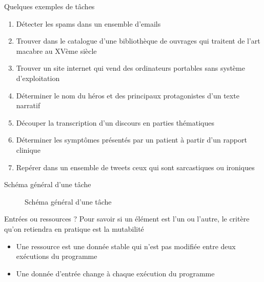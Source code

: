 \documentclass[xcolor={svgnames}, french]{beamer}
\begin{document}
\begin{frame}{Quelques exemples de tâches}
	\begin{enumerate}
		\item Détecter les spams dans un ensemble d'emails
		\item Trouver dans le catalogue d'une bibliothèque de ouvrages qui traitent de l'art macabre au XVème siècle
		\item Trouver un site internet qui vend des ordinateurs portables sans système d'exploitation
		\item Déterminer le nom du héros et des principaux protagonistes d'un texte narratif
		\item Découper la transcription d'un discours en parties thématiques
		\item Déterminer les symptômes présentés par un patient à partir d'un rapport clinique
		\item Repérer dans un ensemble de tweets ceux qui sont sarcastiques ou ironiques
	\end{enumerate}
\end{frame}

\begin{frame}[fragile]{Schéma général d'une tâche}
	\begin{figure}
		\tikzset{external/export=true}
		\caption{Schéma général d'une tâche}
	\end{figure}
\end{frame}

\begin{frame}{Entrées ou ressources ?}
	Pour savoir si un élément est l'un ou l'autre, le critère qu'on retiendra en pratique est la \alert{mutabilité}
	\begin{itemize}
		\item Une ressource est une donnée \alert{stable} qui n'est pas modifiée entre deux exécutions du programme
		\item Une donnée d'entrée \alert{change} à chaque exécution du programme
	\end{itemize}
\end{frame}
\end{document}
